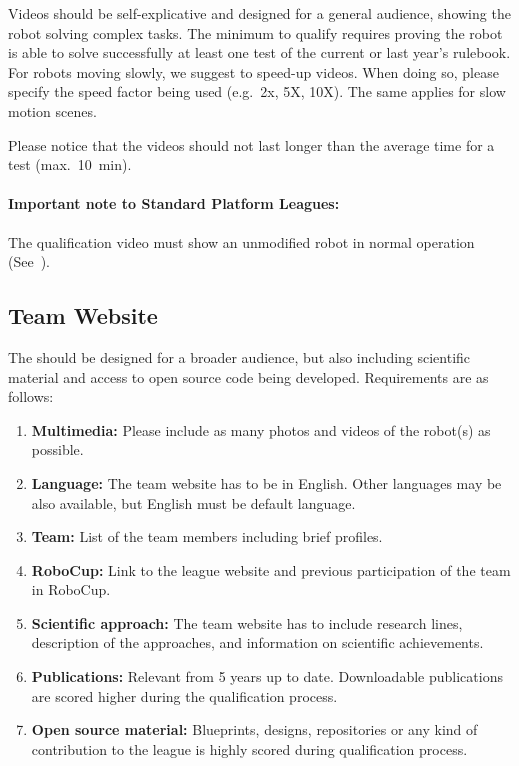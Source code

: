 Videos should be self-explicative and designed for a general audience, showing the  robot solving complex tasks. The minimum to qualify requires proving the robot is able to solve successfully at least one test of the current or last year's rulebook. For robots moving slowly, we suggest to speed-up videos. When doing so, please specify the speed factor being used (e.g.~2x, 5X, 10X). The same applies for slow motion scenes.

Please notice that the videos should not last longer than the average time for a test (max.~\SI{10}{\minute}).

\paragraph{Important note to Standard Platform Leagues:} The qualification video must show an unmodified robot in normal operation (See~).

\subsection{Team Website}

The  should be designed for a broader audience, but also including scientific material and access to open source code being developed. Requirements are as follows:

\begin{enumerate}

	\item \textbf{Multimedia: } Please include as many photos and videos of the robot(s) as possible.

	\item \textbf{Language: } The team website has to be in English. Other languages may be also available, but English must be default language.

	\item \textbf{Team: } List of the team members including brief profiles.

	\item \textbf{RoboCup:} Link to the league website and previous participation of the team in RoboCup.

	\item \textbf{Scientific approach: } The team website has to include research lines, description of the approaches, and information on scientific achievements.

	\item \textbf{Publications: } Relevant  from 5 years up to date. Downloadable publications are scored higher during the qualification process.

	\item \textbf{Open source material: } Blueprints, designs, repositories or any kind of contribution to the league is highly scored during qualification process.
\end{enumerate}


